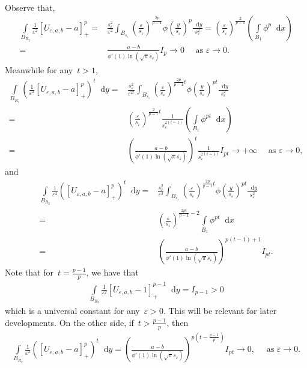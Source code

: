 \documentclass[10pt]{amsart}
\newcommand{\parenthesis}[1]{\left(#1\right)} %
\newcommand{\dd}{\mathop{}\!\mathrm{d}}
\newcommand{\eps}{\varepsilon}
\renewcommand{\to}{\rightarrow}
\begin{document}
Observe that,
\begin{align*}
    \int\limits_{B_{R_2}} \frac{1}{\varepsilon^2 }[U_{\varepsilon,a,b}-a]_+^p
    =&\frac{s_\varepsilon^2}{\varepsilon^2} \int_{B_{s_\varepsilon}} \parenthesis{\frac{\varepsilon}{s_\varepsilon}}^{\frac{2p}{p-1}} \phi\parenthesis{\frac{y}{s_\varepsilon}}^p \frac{\dd{y}}{s_\varepsilon^2}
    =\parenthesis{\frac{\varepsilon}{s_\varepsilon}}^{\frac{2}{p-1}} \parenthesis{\int\limits_{B_1} \phi^p\dd{x}} \\
    =& \frac{a-b}{\phi{'}(1)\ln(\sqrt{\pi}s_\varepsilon)} I_p \to 0 \quad \mbox{ as } \varepsilon\to 0.
\end{align*}
Meanwhile for any~$t>1$,
\begin{align*}
    \int\limits_{B_{R_2}} \parenthesis{\frac{1}{\varepsilon^2 }[U_{\varepsilon,a,b}-a]_+^p}^t \dd y
    =&\frac{s_\varepsilon^2}{\varepsilon^{2t}} \int_{B_{s_\varepsilon}} \parenthesis{\frac{\varepsilon}{s_\varepsilon}}^{\frac{2p}{p-1}t} \phi\parenthesis{\frac{y}{s_\varepsilon}}^{pt} \frac{\dd{y}}{s_\varepsilon^2} \\
    =&\parenthesis{\frac{\varepsilon}{s_\varepsilon}}^{\frac{2}{p-1}t}\frac{1}{s_\varepsilon^{2(t-1)}} \parenthesis{\int\limits_{B_1} \phi^{pt}\dd x} \\
    =&\parenthesis{\frac{a-b}{\phi'(1)\ln(\sqrt{\pi}s_\varepsilon)}}^t \frac{1}{s_\varepsilon^{2(t-1)}} I_{pt}
      \to +\infty \quad \mbox{ as } \varepsilon\to 0,
\end{align*}
and
\begin{align*}
    \int\limits_{B_{R_2}} \frac{1}{\eps^2} \parenthesis{[U_{\varepsilon,a,b}-a]_+^p}^t \dd y
    =&\frac{s_\varepsilon^2}{\varepsilon^{2}} \int_{B_{s_\varepsilon}} \parenthesis{\frac{\varepsilon}{s_\varepsilon}}^{\frac{2p}{p-1}t} \phi\parenthesis{\frac{y}{s_\varepsilon}}^{pt} \frac{\dd{y}}{s_\varepsilon^2} \\
    =&\parenthesis{\frac{\varepsilon}{s_\varepsilon}}^{\frac{2pt}{p-1}-2} \int\limits_{B_1} \phi^{pt}\dd x \\
    =&\parenthesis{\frac{a-b}{\phi{'}(1)\ln(\sqrt{\pi}s_\varepsilon)}}^{p(t-1)+1}I_{pt}.
\end{align*}
Note that for~$t=\frac{p-1}{p}$, we have that
\begin{align*}
    \int\limits_{B_{R_2}} \frac{1}{\eps^2} [U_{\varepsilon,a,b}-1]_+^{p-1}\dd y
    = I_{p-1}>0
\end{align*}
which is a universal constant for any~$\varepsilon>0$.
This will be relevant for later developments.
On the other side, if~$t>\frac{p-1}{p}$, then
\begin{align*}
    \int\limits_{B_{R_2}} \frac{1}{\eps^2} \parenthesis{[U_{\varepsilon,a,b}-a]_+^p}^t \dd y
    =\parenthesis{\frac{a-b}{\phi{'}(1)\ln(\sqrt{\pi}s_\varepsilon)}}^{p(t-\frac{p-1}{p})}I_{pt}\to 0, \quad \mbox{ as } \varepsilon\to 0.
\end{align*}
\end{document}
